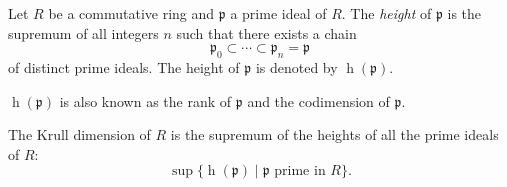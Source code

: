 \documentclass[12pt]{article}
\begin{document}
Let $R$ be a commutative ring and $\mathfrak{p}$ a prime ideal of $R$.  The {\em height} of $\mathfrak{p}$ is the supremum of all integers $n$ such that there exists a chain $$\mathfrak{p}_0 \subset \cdots \subset \mathfrak{p}_n = \mathfrak{p}$$ of distinct prime ideals.  The height of $\mathfrak{p}$ is denoted by $\operatorname{h}(\mathfrak{p})$.

$\operatorname{h}(\mathfrak{p})$ is also known as the rank of $\mathfrak{p}$ and the codimension of $\mathfrak{p}$.

The Krull dimension of $R$ is the supremum of the heights of all the prime ideals of $R$: $$\sup\lbrace \operatorname{h}(\mathfrak{p})
\mid \mathfrak{p}\mbox{ prime in }R \rbrace.$$
\end{document}
